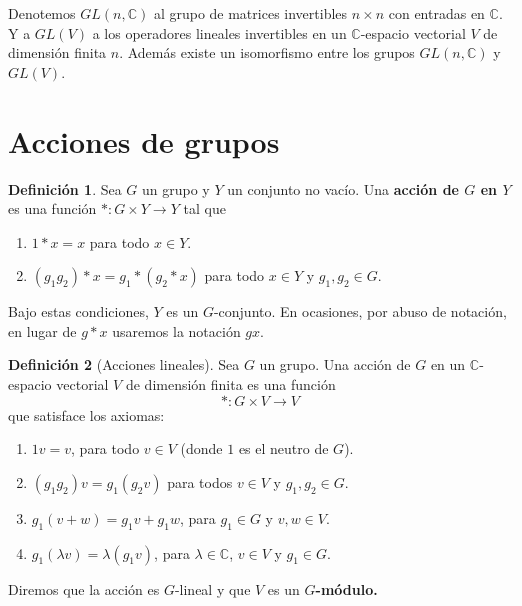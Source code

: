\documentclass[12pt]{book}
\newtheorem{theorem}{Teorema}[section]
\theoremstyle{definition}
\newtheorem{definition}[theorem]{Definición}
\DeclareMathOperator{\im}{im}
\newcounter{in}
\newcounter{ini}
\begin{document}

Denotemos $GL(n,\mathbb{C})$ al grupo de matrices
invertibles  $n \times n$ con entradas en $\mathbb{C}$.  
Y a $GL(V)$ a los operadores lineales invertibles en un
$\mathbb{C}$-espacio vectorial $V$ de dimensión finita $n$.
Además existe un isomorfismo entre los grupos $GL(n,\mathbb{C})$ y $GL(V)$.

\section{Acciones de grupos}

\begin{definition}
  Sea $G$ un grupo y $Y$ un conjunto no vacío. Una  \textbf{acción de $G$
  en $Y$} es una función $*:G \times Y \rightarrow Y$ tal que
\begin{enumerate}
\item $1*x=x$ para todo $x\in Y.$
\item $(g_{1}g_{2})*x=g_{1}*(g_{2}*x)$ para todo $x\in Y$ y $g_{1},g_{2}\in G.$
\end{enumerate}
   Bajo estas condiciones, $Y$ es un $G$-conjunto. En ocasiones, por
   abuso de notación, en lugar de $g*x$ usaremos la notación $gx.$
\end{definition}

\begin{definition}[Acciones lineales]
  \label{Gmodulo}
  Sea $G$ un grupo. Una acción de $G$ en un $\mathbb{C}$-espacio
  vectorial $V$ de dimensión finita es una función
 $$*:G\times V \rightarrow V $$
que satisface los axiomas:
\begin{enumerate}
\item $1v=v$, para todo $v\in V$ (donde $1$ es el neutro de $G$).
\item $(g_{1}g_{2})v=g_{1}(g_{2}v)$ para todos $v\in V$ y
  $g_{1},g_{2}\in G$.
\item $g_{1}(v+w)=g_{1}v+g_{1}w$, para $g_{1}\in G$ y $v,w \in V .$
\item $g_{1}(\lambda v)=\lambda(g_{1}v)$, para $\lambda \in \mathbb{C}$,
  $v\in V$ y $g_{1}\in G.$
\end{enumerate}
Diremos que la acción es $G$-lineal y que $V$ es un \textbf{$G$-módulo.}
\end{definition} 
\end{document}
